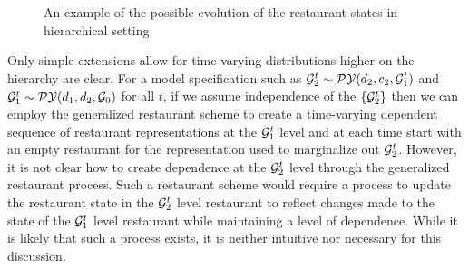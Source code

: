 \begin{figure}[h!tbp] 
	\begin{center}
		\caption{An example of the possible evolution of the restaurant states in hierarchical setting}
	\end{center} 
	\label{figVHPY}
\end{figure} 

Only simple extensions allow for time-varying distributions higher on the hierarchy are clear.  For a model specification such as $\G_2^t \sim \PY(d_2, c_2, \G_1^t)$ and $\G_1^t  \sim \PY(d_1,d_2,\G_0)$ for all $t$, if we assume independence of the $\{ \G_2^t \}$ then we can employ the generalized restaurant scheme to create a time-varying dependent sequence of restaurant representations at the  $\G_1^t$ level and at each time start with an empty restaurant for the representation used to marginalize out $\G_2^t$.  However, it is not clear how to create dependence at the $\G_2^t$ level through the generalized restaurant process.  Such a restaurant scheme would require a process to update the restaurant state in the $\G_2^t$ level restaurant to reflect changes made to the state of the $\G_1^t$ level restaurant while maintaining a level of dependence.  While it is likely that such a process exists, it is neither intuitive nor necessary for this discussion.

